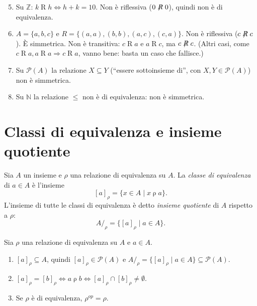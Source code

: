 \documentclass[11pt,a4paper]{article}
\begin{document}
\begin{esempio}
\leavevmode
\begin{enumerate}
    \setcounter{enumi}{4}
    \item Su $\mathbb{Z}$: $k \mathrel{R} h \iff h + k = 10$. Non è
          riflessiva ($0 \not\mathrel{R} 0$), quindi non è di equivalenza.

    \item $A = \{a, b, c\}$ e $R = \{(a,a), (b,b), (a,c), (c,a)\}$.
          Non è riflessiva ($c \not\mathrel{R} c$). È simmetrica. Non è
          transitiva: $c \mathrel{R} a$ e $a \mathrel{R} c$, ma
          $c \not\mathrel{R} c$. (Altri casi, come
          $c \mathrel{R} a, a \mathrel{R} a \Rightarrow c \mathrel{R} a$,
          vanno bene: basta un caso che fallisce.)

    \item Su $\mathcal{P}(A)$ la relazione $X \subseteq Y$ (``essere
          sottoinsieme di'', con $X, Y \in \mathcal{P}(A)$) non è
          simmetrica.

    \item Su $\mathbb{N}$ la relazione $\leq$ non è di equivalenza: non è
          simmetrica.
\end{enumerate}
\end{esempio}

\section{Classi di equivalenza e insieme quotiente}

\begin{definizione}
Sia $A$ un insieme e $\rho$ una relazione di equivalenza su $A$. La
\emph{classe di equivalenza} di $a \in A$ è l'insieme
\[
[a]_\rho = \{x \in A \mid x \mathrel{\rho} a\}.
\]
L'insieme di tutte le classi di equivalenza è detto \emph{insieme
quotiente} di $A$ rispetto a $\rho$:
\[
A/_\rho = \{[a]_\rho \mid a \in A\}.
\]
\end{definizione}

\begin{osservazione}
Sia $\rho$ una relazione di equivalenza su $A$ e $a \in A$.
\begin{enumerate}
    \item $[a]_\rho \subseteq A$, quindi $[a]_\rho \in \mathcal{P}(A)$ e
          $A/_\rho = \{[a]_\rho \mid a \in A\} \subseteq \mathcal{P}(A)$.
    \item $[a]_\rho = [b]_\rho \iff a \mathrel{\rho} b \iff
          [a]_\rho \cap [b]_\rho \neq \emptyset$.
    \item Se $\rho$ è di equivalenza, $\rho^{op} = \rho$.
\end{enumerate}
\end{osservazione}
\end{document}

